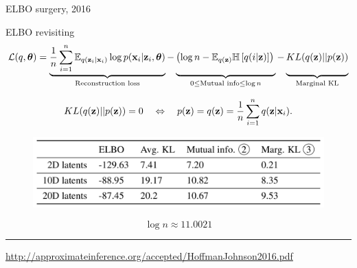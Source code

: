 \begin{frame}{ELBO surgery, 2016}
\begin{block}{ELBO revisiting}
\vspace{-0.3cm}
{\footnotesize
\[
    \mathcal{L}(q, \btheta) = \underbrace{\frac{1}{n} \sum_{i=1}^n \mathbb{E}_{q(\bz_i | \bx_i)} \log p(\bx_i | \bz_i, \btheta)}_{\text{Reconstruction loss}} - \underbrace{\left(\log n - \mathbb{E}_{q(\bz)} \mathbb{H} \left[ q(i | \bz) \right] \right)\vphantom{\sum_{i=1}}}_{0 \leq \text{Mutual info} \leq \log n } - \underbrace{KL(q(\bz) || p(\bz))\vphantom{\sum_{i=1}}}_{\text{Marginal KL}}
\]}
\end{block}
\vspace{-0.3cm}
\[
    KL(q(\mathbf{z}) || p(\mathbf{z})) = 0 \quad \Leftrightarrow \quad p (\mathbf{z}) = q(\mathbf{z}) = \frac{1}{n} \sum_{i=1}^n q(\mathbf{z} | \mathbf{x}_i).
\]
\begin{figure}
    \centering
    \includegraphics[width=0.8\linewidth]{figs/ELBO_surgery.png}
\end{figure}
\[
\log n \approx 11.0021
\]
\vfill
\hrule\medskip
{\scriptsize \href{http://approximateinference.org/accepted/HoffmanJohnson2016.pdf}{http://approximateinference.org/accepted/HoffmanJohnson2016.pdf}}
\end{frame}
